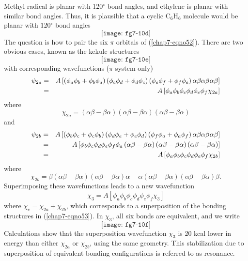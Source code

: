Methyl radical is planar with 120$^{\circ}$ bond angles, and 
ethylene is planar with similar bond angles.  Thus, it is plausible 
that a cyclic C$_6$H$_6$ molecule would be planar with 120$^{\circ}$ 
bond angles
\begin{equation}
\texttt{[image: fg7-10d]}
\label{chap7-eqno52}
\end{equation}
The question is how to pair the six $\pi$ orbitals of
(\ref{chap7-eqno52}).  There are two obvious cases, known as the
kekule structures
\begin{equation}
\texttt{[image: fg7-10e]}
\label{chap7-eqno53}
\end{equation}
with corresponding wavefunctions ($\pi$ system only)
\begin{eqnarray}
\psi_{2a} &=& A \left[ \left( \phi_a \phi_b + \phi_b \phi_a \right) 
\left( \phi_c \phi_d + \phi_d \phi_c \right) \left( \phi_e \phi_f + 
\phi_f \phi_e \right) \alpha \beta \alpha \beta \alpha \beta 
\right]\cr
&=& A \left[ \phi_a \phi_b \phi_c \phi_d \phi_e \phi_f \chi_{2a} 
\right]
\end{eqnarray}
where
\begin{equation}
\chi_{2a} = \left( \alpha \beta - \beta \alpha \right) \left( \alpha 
\beta - \beta \alpha \right) \left( \alpha \beta - \beta \alpha \right)
\end{equation}
and
\begin{eqnarray}
\psi_{2b} &=& A \left[ \left( \phi_b \phi_c + \phi_c \phi_b \right) 
\left( \phi_d \phi_e + \phi_e \phi_d \right) \left( \phi_f \phi_a + 
\phi_a \phi_f \right) \alpha \beta \alpha \beta \alpha \beta \right]\cr
&=& A \left[ \phi_b \phi_c \phi_d \phi_e \phi_f \phi_a  \left( \alpha 
\beta - \beta \alpha \right) \left( \alpha \beta - \beta \alpha 
\right) \left( \alpha \beta - \beta \alpha \right) \right]\cr
&=& A \left[ \phi_a \phi_b \phi_c \phi_d \phi_e \phi_f \chi_{2b} 
\right]
\end{eqnarray}
where
\begin{equation}
\chi_{2b} = \beta \left( \alpha \beta - \beta \alpha \right) \left( 
\alpha \beta - \beta \alpha \right) \alpha - \alpha \left( \alpha 
\beta - \beta \alpha \right) \left( \alpha \beta - \beta \alpha 
\right) \beta.
\end{equation}
Superimposing these wavefunctions leads to a new wavefunction
\begin{equation}
\chi_3 = A \left[ \phi_a \phi_b \phi_c \phi_d \phi_e \phi_f \chi_3 
\right]
\end{equation}
where $\chi_e = \chi_{2a} + \chi_{2b}$,
which corresponds to a superposition of the bonding structures 
in (\ref{chap7-eqno53}).  In $\chi_3$, all six bonds are equivalent, and we write
\begin{equation}
\texttt{[image: fg7-10f]}
\label{chap7-eqno54}
\end{equation}
Calculations show that the superposition wavefunction $\chi_3$ is 20 kcal 
lower in energy than either $\chi_{2a}$ or $\chi_{2b}$, using the same 
geometry.  This stabilization due to superposition of equivalent bonding 
configurations is referred to as resonance.

